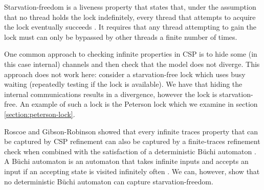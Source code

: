 Starvation-freedom is a liveness property that states that, under the assumption that no thread holds the lock indefinitely, every thread that attempts to acquire the lock eventually succeeds \cite{TAoMP}. It requires that any thread attempting to gain the lock must can only be bypassed by other threads a finite number of times.

One common approach to checking infinite properties in CSP is to hide some (in this case internal) channels and then check that the model does not diverge. This approach does not work here: consider a starvation-free lock which uses busy waiting (repeatedly testing if the lock is available). We have that hiding the internal communications results in a divergence, however the lock is starvation-free. An example of such a lock is the Peterson lock which we examine in section \ref{section:peterson-lock}.

Roscoe and Gibson-Robinson showed that every infinite traces property that can be captured by CSP refinement can also be captured by a finite-traces refinement check when combined with the satisfaction of a deterministic B{\"u}chi automaton \cite{RoscoeBuchi}. A B{\"u}chi automaton is an automaton that takes infinite inputs and accepts an input if an accepting state is visited infinitely often \cite{CAFV}. We can, however, show that no deterministic B{\"u}chi automaton can capture starvation-freedom. 




